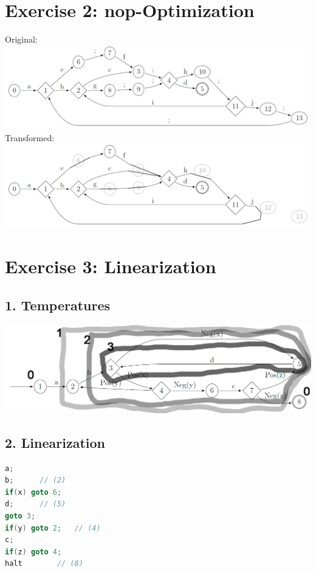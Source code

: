 \documentclass[11pt,a4paper]{scrartcl}
\begin{document}
\section*{Exercise 2: nop-Optimization}
Original:\\
\includegraphics[width=\linewidth]{2org}\\
Transformed:\\
\includegraphics[width=\linewidth]{2}


\section*{Exercise 3: Linearization}
\subsection*{1. Temperatures}
\includegraphics[width=\linewidth]{3}

\subsection*{2. Linearization}
\begin{lstlisting}[language=C]
a;
b;		// (2)
if(x) goto 6;
d;		// (5)
goto 3;
if(y) goto 2;	// (4)
c;
if(z) goto 4;
halt		// (8)

\end{lstlisting}
\end{document}

